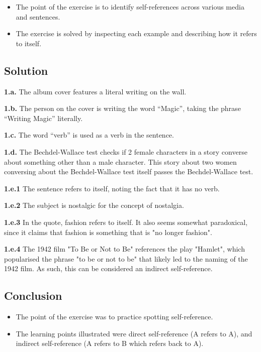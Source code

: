 \documentclass[12pt]{article}
\begin{document}
\begin{itemize}

\item
  The point of the exercise is to identify self-references across various media and sentences.

\item
  The exercise is solved by inspecting each example and describing how it refers to itself.

\end{itemize}


\subsection{Solution}

\textbf{1.a.} The album cover features a literal writing on the wall.

\textbf{1.b.} The person on the cover is writing the word ``Magic'', taking the
phrase ``Writing Magic'' literally.

\textbf{1.c.} The word ``verb'' is used as a verb in the sentence.

\textbf{1.d.} The Bechdel-Wallace test checks if 2 female characters in a story
converse about something other than a male character. This story about two women
conversing about the Bechdel-Wallace test itself passes the Bechdel-Wallace
test.

\textbf{1.e.1} The sentence refers to itself, noting the fact that it has no verb.

\textbf{1.e.2} The subject is nostalgic for the concept of nostalgia.

\textbf{1.e.3} In the quote, fashion refers to itself. It also seems somewhat paradoxical, since it claims that fashion is something that is "no longer fashion".

\textbf{1.e.4} The 1942 film "To Be or Not to Be" references the play "Hamlet", which popularised the phrase "to be or not to be" that likely led to the naming of the 1942 film. As such, this can be considered an indirect self-reference.


\subsection{Conclusion}

\begin{itemize}

\item
  The point of the exercise was to practice spotting self-reference.

\item
  The learning points illustrated were direct self-reference (A refers to A), and indirect self-reference (A refers to B which refers back to A).

\end{itemize}
\end{document}
